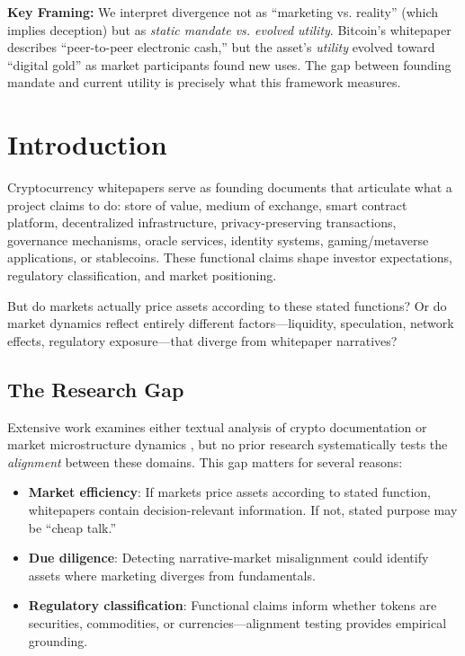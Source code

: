 \documentclass[11pt,twocolumn]{article}
\begin{document}
\textbf{Key Framing:} We interpret divergence not as ``marketing vs. reality'' (which implies deception) but as \textit{static mandate vs. evolved utility}. Bitcoin's whitepaper describes ``peer-to-peer electronic cash,'' but the asset's \textit{utility} evolved toward ``digital gold'' as market participants found new uses. The gap between founding mandate and current utility is precisely what this framework measures.

\clearpage
\tableofcontents

\clearpage
\twocolumn
{}  %


\section{Introduction}
\label{sec:introduction}

Cryptocurrency whitepapers serve as founding documents that articulate what a project claims to do: store of value, medium of exchange, smart contract platform, decentralized infrastructure, privacy-preserving transactions, governance mechanisms, oracle services, identity systems, gaming/metaverse applications, or stablecoins. These functional claims shape investor expectations, regulatory classification, and market positioning.

But do markets actually price assets according to these stated functions? Or do market dynamics reflect entirely different factors---liquidity, speculation, network effects, regulatory exposure---that diverge from whitepaper narratives?

\subsection{The Research Gap}

Extensive work examines either textual analysis of crypto documentation \citep{Liu2021Risks} or market microstructure dynamics \citep{Almeida2024Cryptocurrency}, but no prior research systematically tests the \textit{alignment} between these domains. This gap matters for several reasons:

\begin{itemize}[leftmargin=*]
    \item \textbf{Market efficiency}: If markets price assets according to stated function, whitepapers contain decision-relevant information. If not, stated purpose may be ``cheap talk.''
    \item \textbf{Due diligence}: Detecting narrative-market misalignment could identify assets where marketing diverges from fundamentals.
    \item \textbf{Regulatory classification}: Functional claims inform whether tokens are securities, commodities, or currencies---alignment testing provides empirical grounding.
\end{itemize}
\end{document}
